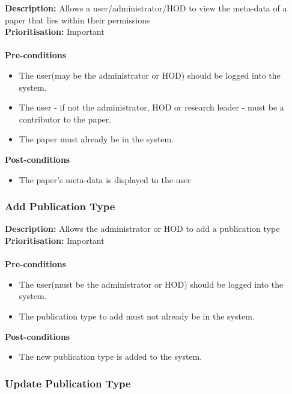 \documentclass[a4paper]{article}
\begin{document}
    \textbf{Description:} Allows a user/administrator/HOD to view the meta-data of a paper that lies within their permissions\\
    \textbf{Prioritisation:} Important\\
    \\
    
    \textbf{Pre-conditions}
     \begin{itemize}
        \item The user(may be the administrator or HOD) should be logged into the system.
        \item The user - if not the administrator, HOD or research leader - must be a contributor to the paper.
        \item The paper must already be in the system.
   \end{itemize}
    
    \textbf{Post-conditions}
    \begin{itemize}
        \item The paper's meta-data is displayed to the user
    \end{itemize}
\pagebreak

    \subsubsection{Add Publication Type}

    \textbf{Description:} Allows the administrator or HOD to add a publication type \\
        \textbf{Prioritisation:} Important\\
        \\
        
        
    \textbf{Pre-conditions}
     \begin{itemize}
        \item The user(must be the administrator or HOD) should be logged into the system.
        \item The publication type to add must not already be in the system.
   \end{itemize}
    
    \textbf{Post-conditions}
    \begin{itemize}
        \item The new publication type is added to the system.
    \end{itemize}
    
    \subsubsection{Update Publication Type}
    
\end{document}
